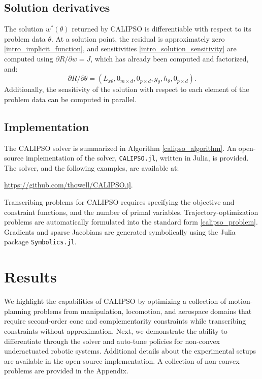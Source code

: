 \subsection{Solution derivatives}
The solution $w^*(\theta)$ returned by CALIPSO is differentiable with respect to its problem data $\theta$. At a solution point, the residual is approximately zero \eqref{intro_implicit_function}, and sensitivities \eqref{intro_solution_sensitivity} are computed using $\partial R / \partial w = J$, which has already been computed and factorized, and:
\begin{equation} 
	\partial R / \partial \theta = (
	L_{x\theta}, 
	0_{m \times d}, 
	0_{p \times d},
	g_{\theta},
	h_{\theta},
	0_{p \times d}).
\end{equation}
Additionally, the sensitivity of the solution with respect to each element of the problem data can be computed in parallel.

\subsection{Implementation}
The CALIPSO solver is summarized in Algorithm \ref{calipso_algorithm}. An open-source implementation of the solver, \texttt{CALIPSO.jl}, written in Julia, is provided. The solver, and the following examples, are available at: 
\begin{center}
	\url{https://github.com/thowell/CALIPSO.jl}. 
\end{center}

Transcribing problems for CALIPSO requires specifying the objective and constraint functions, and the number of primal variables. Trajectory-optimization problems are automatically formulated into the standard form \eqref{calipso_problem}. Gradients and sparse Jacobians are generated symbolically using the Julia package \texttt{Symbolics.jl}.

\section{Results} \label{calipso_results}
We highlight the capabilities of CALIPSO by optimizing a collection of motion-planning problems from manipulation, locomotion, and aerospace domains that require second-order cone and complementarity constraints while transcribing constraints without approximation. Next, we demonstrate the ability to differentiate through the solver and auto-tune policies for non-convex underactuated robotic systems. Additional details about the experimental setups are available in the open-source implementation. A collection of non-convex problems are provided in the Appendix.

